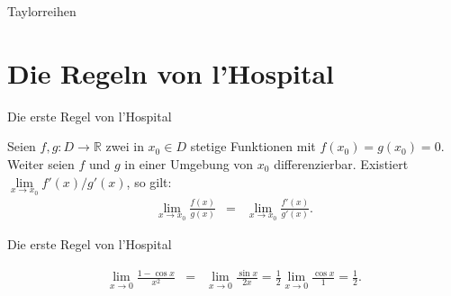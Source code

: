 \documentclass[german]{beamer}
\newcommand{\bq}{\begin{eqnarray*}}
\newcommand{\eq}{\end{eqnarray*}}
\begin{document}
\begin{frame}{Taylorreihen}

\begin{center}
\end{center}

\end{frame}


\section{Die Regeln von l'Hospital}

\frame{\sectionpage}

\begin{frame}{Die erste Regel von l'Hospital}

\begin{theorem}
Seien $f,g : D \rightarrow \mathbb R$ zwei in $x_0 \in D$ stetige Funktionen mit
$f(x_0)=g(x_0)=0$. Weiter seien $f$ und $g$ in einer Umgebung von $x_0$ differenzierbar.
Existiert $\lim\limits_{x\rightarrow x_0} f'(x)/g'(x)$, so gilt:
\bq
 \lim\limits_{x\rightarrow x_0} \frac{f(x)}{g(x)} & = & \lim\limits_{x\rightarrow x_0} \frac{f'(x)}{g'(x)}.
\eq
\end{theorem}

\end{frame}

\begin{frame}{Die erste Regel von l'Hospital}

\begin{example}
\bq
 \lim\limits_{x\rightarrow 0} \frac{1-\cos x}{x^2}
 & = & 
 \lim\limits_{x\rightarrow 0} \frac{\sin x}{2 x}
 =
 \frac{1}{2} \lim\limits_{x\rightarrow 0} \frac{\cos x}{1}
 = \frac{1}{2}.
\eq
\end{example}

\end{frame}
\end{document}
